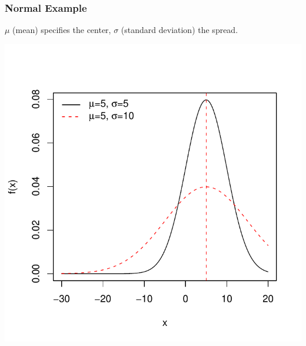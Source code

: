 \documentclass[slides]{beamer}
\begin{document}
\begin{frame}
\frametitle{Normal Example}
$\mu$ (mean) specifies the center, $\sigma$ (standard deviation) the spread.
\begin{center}
\includegraphics{figure/lec02-004}
\end{center}
\end{frame}
\end{document}
